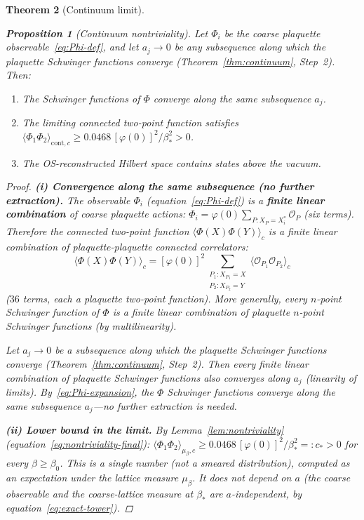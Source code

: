 \documentclass[11pt]{article}
\newtheorem{theorem}{Theorem}[section]
\newtheorem{proposition}[theorem]{Proposition}
\theoremstyle{definition}
\begin{document}
\begin{theorem}[Continuum limit]
\begin{proposition}[Continuum nontriviality]%
\label{prop:continuum-nontrivial}
Let $\Phi_i$ be the coarse plaquette observable~\eqref{eq:Phi-def},
and let $a_j\to 0$ be any subsequence along which the
plaquette Schwinger functions converge
(Theorem~\ref{thm:continuum}, Step~2).
Then:
\begin{enumerate}[nosep,label=(\roman*)]
\item The Schwinger functions of $\Phi$ converge along the
same subsequence $a_j$.
\item The limiting connected two-point function satisfies
$\langle\Phi_1\Phi_2\rangle_{\mathrm{cont},c}
\ge 0.0468\,[\varphi(0)]^2/\beta_*^2>0$.
\item The OS-reconstructed Hilbert space contains states
above the vacuum.
\end{enumerate}
\end{proposition}

\begin{proof}
\textbf{(i) Convergence along the same subsequence
(no further extraction).}
The observable $\Phi_i$ (equation~\eqref{eq:Phi-def}) is a
\textbf{finite linear combination} of coarse plaquette actions:
$\Phi_i=\varphi(0)\sum_{P:X_P=X_i^*}\mathcal{O}_P$
(six terms).  Therefore the connected two-point function
$\langle\Phi(X)\Phi(Y)\rangle_c$ is a finite linear combination
of plaquette-plaquette connected correlators:
\begin{equation}\label{eq:Phi-expansion}
\langle\Phi(X)\Phi(Y)\rangle_c
=[\varphi(0)]^2\sum_{\substack{P_1:X_{P_1}=X\\P_2:X_{P_2}=Y}}
\langle\mathcal{O}_{P_1}\mathcal{O}_{P_2}\rangle_c
\end{equation}
($36$ terms, each a plaquette two-point function).
More generally, every $n$-point Schwinger function of $\Phi$
is a finite linear combination of plaquette $n$-point
Schwinger functions (by multilinearity).

Let $a_j\to 0$ be a subsequence along which the
\emph{plaquette} Schwinger functions converge
(Theorem~\ref{thm:continuum}, Step~2).  Then every
finite linear combination of plaquette Schwinger functions
also converges along $a_j$ (linearity of limits).
By~\eqref{eq:Phi-expansion}, the $\Phi$ Schwinger functions
converge along the \emph{same} subsequence $a_j$---no
further extraction is needed.

\textbf{(ii) Lower bound in the limit.}
By Lemma~\ref{lem:nontriviality}
(equation~\eqref{eq:nontriviality-final}):
$\langle\Phi_1\Phi_2\rangle_{\mu_\beta,c}
\ge 0.0468\,[\varphi(0)]^2/\beta_*^2=:c_*>0$
for every $\beta\ge\beta_0$.
This is a \emph{single number} (not a smeared distribution),
computed as an expectation under the lattice measure
$\mu_\beta$.  It does not depend on $a$ (the coarse
observable and the coarse-lattice measure at $\beta_*$
are $a$-independent, by equation~\eqref{eq:exact-tower}).


\end{proof}
\end{theorem}
\end{document}
